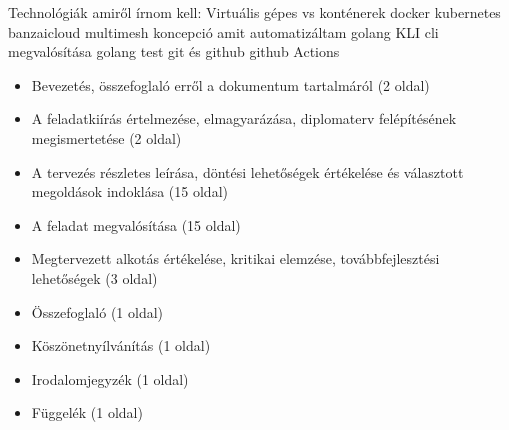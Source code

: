 Technológiák amiről írnom kell:
Virtuális gépes vs konténerek
docker
kubernetes
banzaicloud multimesh koncepció amit automatizáltam
golang
KLI cli megvalósítása
golang test
git és github
github Actions

\begin{itemize}
    \item Bevezetés, összefoglaló erről a dokumentum tartalmáról (2 oldal)
    \item A feladatkiírás értelmezése, elmagyarázása, diplomaterv felépítésének megismertetése (2 oldal)
    \item A tervezés részletes leírása, döntési lehetőségek értékelése és választott megoldások indoklása (15 oldal)
    \item A feladat megvalósítása (15 oldal)
    \item Megtervezett alkotás értékelése, kritikai elemzése, továbbfejlesztési lehetőségek (3 oldal)
    \item Összefoglaló (1 oldal)
    \item Köszönetnyílvánítás (1 oldal)
    \item Irodalomjegyzék (1 oldal)
    \item Függelék (1 oldal)
  \end{itemize}